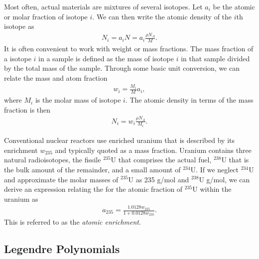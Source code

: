 Most often, actual materials are mixtures of several isotopes. Let $a_i$ be the atomic or molar fraction of isotope $i$. We can then write the atomic density of the $i$th isotope as
\begin{align}
  N_i = a_i N = a_i \frac{ \rho N_A}{M} .
\end{align}
It is often convenient to work with weight or mass fractions. The mass fraction of a isotope $i$ in a sample is defined as the mass of isotope $i$ in that sample divided by the total mass of the sample. Through some basic unit conversion, we can relate the mass and atom fraction
\begin{align}
  w_i = \frac{M_i}{M} a_i,
\end{align}
where $M_i$ is the molar mass of isotope $i$. The atomic density in terms of the mass fraction is then
\begin{align}
  N_i = w_i \frac{ \rho N_A}{M_i} .
\end{align}

Conventional nuclear reactors use enriched uranium that is described by its enrichment $w_{235}$ and typically quoted as a mass fraction. Uranium contains three natural radioisotopes, the fissile $^{235}$U that comprises the actual fuel, $^{238}$U that is the bulk amount of the remainder, and a small amount of $^{234}$U. If we neglect $^{234}$U and approximate the molar masses of $^{235}$U as 235 g/mol and $^{238}$U g/mol, we can derive an expression relating the for the atomic fraction of $^{235}$U within the uranium as
\begin{align}
  a_{235} = \frac{ 1.0128 w_{235} }{ 1 + 0.0128 w_{235} } .
\end{align}
This is referred to as the \emph{atomic enrichment}. 

\subsection{Legendre Polynomials}

